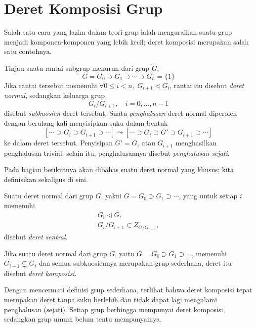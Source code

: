\section{Deret Komposisi Grup}\label{sec:composition-series-grp}
Salah satu cara yang lazim dalam teori grup ialah menguraikan suatu grup menjadi komponen-komponen yang lebih kecil; deret komposisi merupakan salah satu contohnya.

\begin{definition}\label{def:normal-series}
	Tinjau suatu rantai subgrup menurun dari grup $G$,
	\[ G = G_0 \supset G_1 \supset \cdots \supset G_n = \{1\} \]
	Jika rantai tersebut memenuhi $\forall 0 \leq i < n,\;  G_{i+1} \lhd G_i$, rantai itu disebut \emph{deret normal}, sedangkan keluarga grup
	\[ G_i/G_{i+1}, \quad i=0, \ldots, n-1 \]
	disebut \emph{subkuosien} deret tersebut. Suatu \emph{penghalusan} deret normal diperoleh dengan berulang kali menyisipkan suku dalam bentuk 
	\[ \left[ \cdots \supset G_i \supset G_{i+1} \supset \cdots \right] \leadsto \left[ \cdots \supset G_i \supset G' \supset G_{i+1} \supset \cdots \right] \]
	ke dalam deret tersebut. Penyisipan $G' = G_i$ atau $G_{i+1}$ menghasilkan penghalusan trivial; selain itu, penghalusannya disebut \emph{penghalusan sejati}.
\end{definition}

Pada bagian berikutnya akan dibahas suatu deret normal yang khusus; kita definisikan sekaligus di sini.
\begin{definition}\label{def:central-series}
	Suatu deret normal dari grup $G$, yakni $G = G_0 \supset G_1 \supset \cdots$, yang untuk setiap $i$ memenuhi
	\begin{gather*}
		G_i \lhd G, \\
		G_i/G_{i+1} \subset Z_{G/G_{i+1}},
	\end{gather*}
	disebut \emph{deret sentral}.
\end{definition}

\begin{definition}\label{def:composition-series}
	Jika suatu deret normal dari grup $G$, yaitu $G = G_0 \supset G_1 \supset \cdots$, memenuhi $G_{i+1} \subsetneq G_i$ dan semua subkuosiennya merupakan grup sederhana, deret itu disebut \emph{deret komposisi}.
\end{definition}
Dengan mencermati definisi grup sederhana, terlihat bahwa deret komposisi tepat merupakan deret tanpa suku berlebih dan tidak dapat lagi mengalami penghalusan (sejati). Setiap grup berhingga mempunyai deret komposisi, sedangkan grup umum belum tentu mempunyainya.

